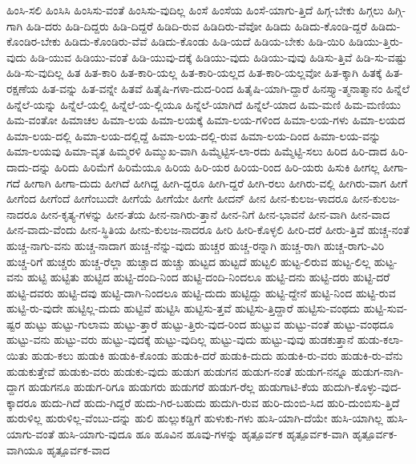 {ಹಿಂಸಿ-ಸಲಿ
ಹಿಂಸಿಸಿ
ಹಿಂಸಿಸು-ವಂತೆ
ಹಿಂಸಿಸು-ವುದಿಲ್ಲ
ಹಿಂಸೆ
ಹಿಂಸೆಯ
ಹಿಂಸೆ-ಯಾಗು-ತ್ತಿದೆ
ಹಿಗ್ಗ-ಬೇಕು
ಹಿಗ್ಗಲು
ಹಿಗ್ಗಿ-ಗಾಗಿ
ಹಿಡಿ-ದರು
ಹಿಡಿ-ದಿದ್ದರು
ಹಿಡಿ-ದಿದ್ದರೆ
ಹಿಡಿದಿ-ರುವ
ಹಿಡಿದಿರು-ವೆವೋ
ಹಿಡಿದು
ಹಿಡಿದು-ಕೊಂಡಿ-ದ್ದರೆ
ಹಿಡಿದು-ಕೊಂಡಿರ-ಬೇಕು
ಹಿಡಿದು-ಕೊಂಡಿರು-ವೆವೆ
ಹಿಡಿದು-ಕೊಂಡು
ಹಿಡಿ-ಯದೆ
ಹಿಡಿಯ-ಬೇಕು
ಹಿಡಿ-ಯಿರಿ
ಹಿಡಿಯು-ತ್ತಿರು-ವುದು
ಹಿಡಿ-ಯುವ
ಹಿಡಿಯು-ವಂತೆ
ಹಿಡಿ-ಯುವು-ದಕ್ಕೆ
ಹಿಡಿಯು-ವುದು
ಹಿಡಿಯು-ವುವು
ಹಿಡಿಸು-ತ್ತಿವೆ
ಹಿಡಿ-ಸು-ವಷ್ಟು
ಹಿಡಿ-ಸು-ವುದಿಲ್ಲ
ಹಿತ
ಹಿತ-ಕಾರಿ
ಹಿತ-ಕಾರಿ-ಯಲ್ಲ
ಹಿತ-ಕಾರಿ-ಯಲ್ಲದ
ಹಿತ-ಕಾರಿ-ಯಲ್ಲವೋ
ಹಿತ-ಕ್ಕಾಗಿ
ಹಿತಕ್ಕೆ
ಹಿತ-ರಕ್ಷಣೆಯ
ಹಿತ-ವನ್ನು
ಹಿತ-ವನ್ನೇ
ಹಿತವೆ
ಹಿತೈಷಿ-ಗಳಾ-ದುದ-ರಿಂದ
ಹಿತೈಷಿ-ಯಾಗಿ-ದ್ದಾರೆ
ಹಿನಸ್ತ್ಯಾ-ತ್ಮನಾತ್ಮಾನಂ
ಹಿನ್ನೆಲೆ
ಹಿನ್ನೆಲೆ-ಯನ್ನು
ಹಿನ್ನೆಲೆ-ಯಲ್ಲಿ
ಹಿನ್ನೆಲೆ-ಯ-ಲ್ಲಿಯೂ
ಹಿನ್ನೆಲೆ-ಯಾಗಿದೆ
ಹಿನ್ನೆಲೆ-ಯಾದ
ಹಿಮ-ಮಣಿ
ಹಿಮ-ಮಣಿಯು
ಹಿಮ-ವಂತೋ
ಹಿಮಾಚಲ
ಹಿಮಾ-ಲಯ
ಹಿಮಾ-ಲಯಕ್ಕೆ
ಹಿಮಾ-ಲಯ-ಗಳಿಂದ
ಹಿಮಾ-ಲಯ-ಗಳು
ಹಿಮಾ-ಲಯದ
ಹಿಮಾ-ಲಯ-ದಲ್ಲಿ
ಹಿಮಾ-ಲಯ-ದಲ್ಲಿದ್ದೆ
ಹಿಮಾ-ಲಯ-ದಲ್ಲಿ-ರುವ
ಹಿಮಾ-ಲಯ-ದಿಂದ
ಹಿಮಾ-ಲಯ-ವನ್ನು
ಹಿಮಾ-ಲಯವು
ಹಿಮಾ-ವೃತ
ಹಿಮ್ಮರಳಿ
ಹಿಮ್ಮುಖ-ವಾಗಿ
ಹಿಮ್ಮೆಟ್ಟಿಸ-ಲಾ-ರದು
ಹಿಮ್ಮೆಟ್ಟಿ-ಸಲು
ಹಿರಿದ
ಹಿರಿ-ದಾದ
ಹಿರಿ-ದಾದು-ದನ್ನು
ಹಿರಿದು
ಹಿರಿಮೆಗೆ
ಹಿರಿಮೆಯೂ
ಹಿರಿಯ
ಹಿರಿ-ಯರ
ಹಿರಿಯ-ರಿಂದ
ಹಿರಿ-ಯರು
ಹಿಸುಕಿ
ಹೀಗಲ್ಲ
ಹೀಗಾ-ಗದೆ
ಹೀಗಾಗಿ
ಹೀಗಾ-ದುದು
ಹೀಗಿದೆ
ಹೀಗಿದ್ದ
ಹೀಗಿ-ದ್ದರೂ
ಹೀಗಿ-ದ್ದರೆ
ಹೀಗಿ-ರಲು
ಹೀಗಿರು-ವಲ್ಲಿ
ಹೀಗಿರು-ವಾಗ
ಹೀಗೆ
ಹೀಗೆಂದ
ಹೀಗೆಂದೆ
ಹೀಗೆಂಬುದೇ
ಹೀಗೆಯೆ
ಹೀಗೆಯೇ
ಹೀಗೇ
ಹೀದನ್
ಹೀನ
ಹೀನ-ಕುಲಜ-ಳಾದರೂ
ಹೀನ-ಕುಲಜ-ನಾದರೂ
ಹೀನ-ಕೃತ್ಯ-ಗಳನ್ನು
ಹೀನ-ತೆಯ
ಹೀನ-ನಾಗಿರು-ತ್ತಾನೆ
ಹೀನ-ನಿಗೆ
ಹೀನ-ಭಾವನೆ
ಹೀನ-ವಾಗಿ
ಹೀನ-ವಾದ
ಹೀನ-ವಾದು-ವೆಂದು
ಹೀನ-ಸ್ಥಿತಿಯ
ಹೀನು-ಕುಲಜ-ನಾದರೂ
ಹೀರಿ
ಹೀರಿ-ಕೊಳ್ಳಲಿ
ಹೀರಿ-ದರೆ
ಹೀರು-ತ್ತಿವೆ
ಹುಚ್ಚ-ನಂತೆ
ಹುಚ್ಚ-ನಾಗು-ವನು
ಹುಚ್ಚ-ನಾದಾಗ
ಹುಚ್ಚ-ನೆನ್ನು-ವುದು
ಹುಚ್ಚರ
ಹುಚ್ಚ-ರನ್ನಾಗಿ
ಹುಚ್ಚ-ರಾಗಿ
ಹುಚ್ಚ-ರಾಗು-ವಿರಿ
ಹುಚ್ಚ-ರಿಗೆ
ಹುಚ್ಚರು
ಹುಚ್ಚ-ರೆಲ್ಲಾ
ಹುಚ್ಚಾದ
ಹುಚ್ಚು
ಹುಟ್ಟದ
ಹುಟ್ಟದೆ
ಹುಟ್ಟಲಿ
ಹುಟ್ಟ-ಲಿರುವ
ಹುಟ್ಟ-ಲಿಲ್ಲ
ಹುಟ್ಟ-ವನು
ಹುಟ್ಟಿ
ಹುಟ್ಟಿತು
ಹುಟ್ಟಿದ
ಹುಟ್ಟಿ-ದಂದಿ-ನಿಂದ
ಹುಟ್ಟಿ-ದಂದಿ-ನಿಂದಲೂ
ಹುಟ್ಟಿ-ದನು
ಹುಟ್ಟಿ-ದರು
ಹುಟ್ಟಿ-ದರೆ
ಹುಟ್ಟಿ-ದವರು
ಹುಟ್ಟಿ-ದವು
ಹುಟ್ಟಿ-ದಾಗಿ-ನಿಂದಲೂ
ಹುಟ್ಟಿ-ದುದು
ಹುಟ್ಟಿದ್ದು
ಹುಟ್ಟಿ-ದ್ದೇನೆ
ಹುಟ್ಟಿ-ನಿಂದ
ಹುಟ್ಟಿ-ರುವ
ಹುಟ್ಟಿ-ರು-ವುದೇ
ಹುಟ್ಟಿಲ್ಲ-ದುದು
ಹುಟ್ಟಿವೆ
ಹುಟ್ಟಿಸಿ
ಹುಟ್ಟಿಸು-ತ್ತವೆ
ಹುಟ್ಟಿಸು-ತ್ತಿದ್ದಾರೆ
ಹುಟ್ಟಿಸು-ವಂಥದು
ಹುಟ್ಟಿ-ಸುವ-ಷ್ಟರ
ಹುಟ್ಟು
ಹುಟ್ಟು-ಗುಲಾಮ
ಹುಟ್ಟು-ತ್ತಾರೆ
ಹುಟ್ಟು-ತ್ತಿರು-ವುದ-ರಿಂದ
ಹುಟ್ಟುವ
ಹುಟ್ಟು-ವಂತೆ
ಹುಟ್ಟು-ವಂಥದೂ
ಹುಟ್ಟು-ವನು
ಹುಟ್ಟು-ವರು
ಹುಟ್ಟು-ವುದಕ್ಕೆ
ಹುಟ್ಟು-ವುದಿಲ್ಲ
ಹುಟ್ಟು-ವುದು
ಹುಟ್ಟು-ವುವು
ಹುಡಕುತ್ತಾನೆ
ಹುಡು-ಕಲಾ-ಯಿತು
ಹುಡು-ಕಲು
ಹುಡುಕಿ
ಹುಡುಕಿ-ಕೊಂಡು
ಹುಡುಕಿ-ದರೆ
ಹುಡುಕಿ-ದುದು
ಹುಡುಕಿ-ರು-ವರು
ಹುಡುಕಿ-ರು-ವೆನು
ಹುಡುಕುತ್ತೇವೆ
ಹುಡುಕು-ವರು
ಹುಡುಕು-ವುದು
ಹುಡುಗ
ಹುಡುಗನ
ಹುಡುಗ-ನಂತೆ
ಹುಡುಗ-ನನ್ನೂ
ಹುಡುಗ-ನಾಗಿ-ದ್ದಾಗ
ಹುಡುಗನೂ
ಹುಡುಗ-ರಿಗೂ
ಹುಡುಗರು
ಹುಡುಗರೆ
ಹುಡುಗ-ರೆಲ್ಲ
ಹುಡುಗಾಟಿ-ಕೆಯ
ಹುದುಗಿ-ಕೊಳ್ಳು-ವುದ-ಕ್ಕಾದರೂ
ಹುದು-ಗಿದೆ
ಹುದು-ಗಿದ್ದರೆ
ಹುದು-ಗಿರ-ಬಹುದು
ಹುದುಗಿ-ರುವ
ಹುರಿ-ದುಂಬಿ-ಸಿದ
ಹುರಿ-ದುಂಬಿಸು-ತ್ತಿದೆ
ಹುರುಳಿಲ್ಲ
ಹುರುಳಿಲ್ಲ-ವೆಂಬು-ದನ್ನು
ಹುಲಿ
ಹುಲ್ಲುಕಡ್ಡಿಗೆ
ಹುಳುಕು-ಗಳು
ಹುಸಿ-ಯಾಗಿ-ದೆಯೇ
ಹುಸಿ-ಯಾಗಿಲ್ಲ
ಹುಸಿ-ಯಾಗು-ವಂತೆ
ಹುಸಿ-ಯಾಗು-ವುದೂ
ಹೂ
ಹೂವಿನ
ಹೂವು-ಗಳನ್ನು
ಹೃತ್ಪೂರ್ವಕ
ಹೃತ್ಪೂರ್ವಕ-ವಾಗಿ
ಹೃತ್ಪೂರ್ವಕ-ವಾಗಿಯೂ
ಹೃತ್ಪೂರ್ವಕ-ವಾದ
}
